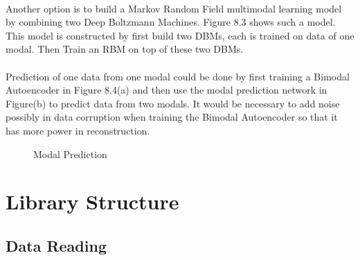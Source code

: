 \documentclass[12pt]{article}
\begin{document}
\\
Another option is to build a Markov Random Field multimodal learning model by combining two Deep Boltzmann Machines. Figure 8.3 shows such a model. This model is constructed by first build two DBMs, each is trained on data of one modal. Then Train an RBM on top of these two DBMs.\\
\\
Prediction of one data from one modal could be done by first training a Bimodal Autoencoder in Figure 8.4(a) and then use the modal prediction network in Figure(b) to predict data from two modals. It would be necessary to add noise possibly in data corruption when training the Bimodal Autoencoder so that it has more power in reconstruction.
 \begin{figure}[!t]
\centering
{}
\caption{Modal Prediction}
\label{fig5}
\end{figure}
\clearpage
\section{Library Structure}
\subsection{Data Reading}
\end{document}
